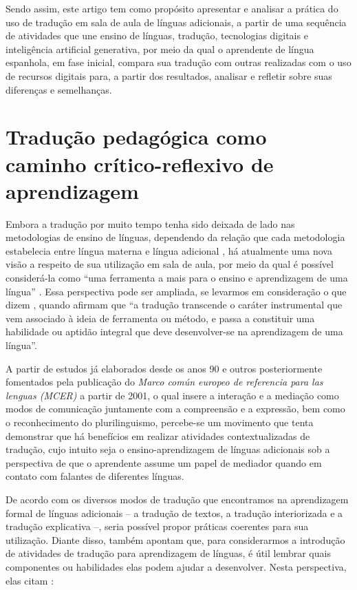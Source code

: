 \documentclass[portuguese]{textolivre}
\begin{document}
Sendo assim, este artigo tem como propósito apresentar e analisar a prática do uso de tradução em sala de aula de línguas adicionais, a partir de uma sequência de atividades que une ensino de línguas, tradução, tecnologias digitais e inteligência artificial generativa, por meio da qual o aprendente de língua espanhola, em fase inicial, compara sua tradução com outras realizadas com o uso de recursos digitais para, a partir dos resultados, analisar e refletir sobre suas diferenças e semelhanças.


\section{Tradução pedagógica como caminho crítico-reflexivo de aprendizagem}\label{sec-2}

Embora a tradução por muito tempo tenha sido deixada de lado nas metodologias de ensino de línguas, dependendo da relação que cada metodologia esta\-belecia entre língua materna e língua adicional \cite{bergmann2024}, há atualmente uma nova visão a respeito de sua utilização em sala de aula, por meio da qual é possível considerá-la como “uma ferramenta a mais para o ensino e aprendizagem de uma língua” \cite[p. 9]{pintado2019}. Essa perspectiva pode ser ampliada, se levarmos em consideração o que dizem \textcite[p. 616, tradução nossa]{carreres2019}, quando afirmam que “a tradução transcende o caráter instrumental que vem associado à ideia de ferramenta ou método, e passa a constituir uma habilidade ou aptidão integral que deve desenvolver-se na aprendizagem de uma língua”.

A partir de estudos já elaborados desde os anos 90 e outros posteriormente fomentados pela publicação do \textit{Marco común europeo de referencia para las lenguas (MCER)} a partir de 2001, o qual insere a interação e a mediação como modos de comunicação juntamente com a compreensão e a expressão, bem como o reconhecimento do plurilinguismo, percebe-se um movimento que tenta demonstrar que há benefícios em realizar atividades contextualizadas de tradução, cujo intuito seja o ensino-aprendizagem de línguas adicionais sob a perspectiva de que o aprendente assume um papel de mediador quando em contato com falantes de diferentes línguas.

De acordo com os diversos modos de tradução que encontramos na aprendizagem formal de línguas adicionais -- a tradução de textos, a tradução interiorizada e a tradução explicativa \cite{HurtadoAlbir1987, ArribaGarcia1996, pintado2019} --, seria possível propor práticas coerentes para sua utilização. Diante disso, \textcite{carreres2019} também apontam que, para considerarmos a introdução de atividades de tradução para aprendizagem de línguas, é útil lembrar quais componentes ou habilidades elas podem ajudar a desenvolver. Nesta perspectiva, elas citam \cite[p. 619, tradução nossa]{carreres2019}:
\end{document}
